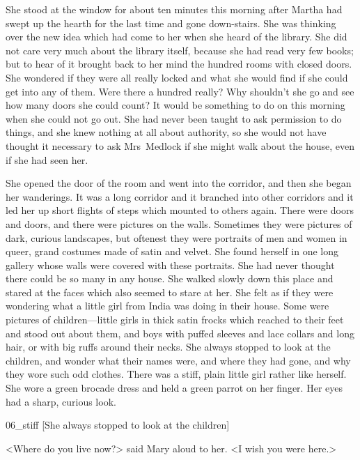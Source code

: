 She stood at the window for about ten minutes this morning after Martha had swept up the hearth for the last time and gone down-stairs. She was thinking over the new idea which had come to her when she heard of the library. She did not care very much about the library itself, because she had read very few books; but to hear of it brought back to her mind the hundred rooms with closed doors. She wondered if they were all really locked and what she would find if she could get into any of them. Were there a hundred really? Why shouldn't she go and see how many doors she could count? It would be something to do on this morning when she could not go out. She had never been taught to ask permission to do things, and she knew nothing at all about authority, so she would not have thought it necessary to ask Mrs~Medlock if she might walk about the house, even if she had seen her.

She opened the door of the room and went into the corridor, and then she began her wanderings. It was a long corridor and it branched into other corridors and it led her up short flights of steps which mounted to others again. There were doors and doors, and there were pictures on the walls. Sometimes they were pictures of dark, curious landscapes, but oftenest they were portraits of men and women in queer, grand costumes made of satin and velvet. She found herself in one long gallery whose walls were covered with these portraits. She had never thought there could be so many in any house. She walked slowly down this place and stared at the faces which also seemed to stare at her. She felt as if they were wondering what a little girl from India was doing in their house. Some were pictures of children—little girls in thick satin frocks which reached to their feet and stood out about them, and boys with puffed sleeves and lace collars and long hair, or with big ruffs around their necks. She always stopped to look at the children, and wonder what their names were, and where they had gone, and why they wore such odd clothes. There was a stiff, plain little girl rather like herself. She wore a green brocade dress and held a green parrot on her finger. Her eyes had a sharp, curious look.

\begin{colorbigpic}
	[\basicscale]
	{06_stiff}
	[She always stopped to look at the children]
\end{colorbigpic}

<Where do you live now?> said Mary aloud to her. <I wish you were here.>

